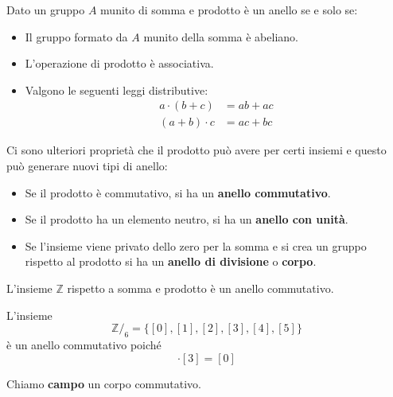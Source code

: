 \begin{theorem}
	Dato un gruppo $A$ munito di somma e prodotto \`e un anello se e solo se:
	\begin{itemize}
		\item Il gruppo formato da $A$ munito della somma \`e abeliano.
		\item L'operazione di prodotto \`e associativa.
		\item Valgono le seguenti leggi distributive:
		      \begin{equation*}
			      \begin{array}{ll}
				      a \cdot (b + c) & = ab + ac \\
				      (a + b) \cdot c & = ac + bc
			      \end{array}
		      \end{equation*}
	\end{itemize}
	Ci sono ulteriori propriet\`a che il prodotto pu\`o avere per certi insiemi e questo
	pu\`o generare nuovi tipi di anello:
	\begin{itemize}
		\item Se il prodotto \`e commutativo, si ha un \textbf{anello commutativo}.
		\item Se il prodotto ha un elemento neutro, si ha un \textbf{anello con unit\`a}.
		\item Se l'insieme viene privato dello zero per la somma e si crea un gruppo rispetto
		      al prodotto si ha un \textbf{anello di divisione} o \textbf{corpo}.
	\end{itemize}
\end{theorem}

\begin{example}
	L'insieme $\mathbb{Z}$ rispetto a somma e prodotto \`e un anello commutativo.
\end{example}

\begin{example}
	L'insieme
	\begin{equation*}
		\mathbb{Z}/_6 = \{ [0], [1], [2], [3], [4], [5] \}
	\end{equation*}
	\`e un anello commutativo poich\'e
	\begin{equation*}
		[2] \cdot [3] = [0]
	\end{equation*}
\end{example}

\begin{definition}
	Chiamo \textbf{campo} un corpo commutativo.
\end{definition}

